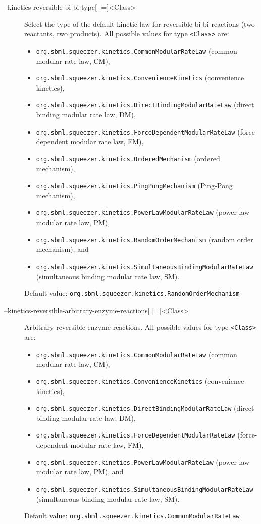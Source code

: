 \begin{description}
\item[--kinetics-reversible-bi-bi-type{[} |={]}<Class>]
  Select the type of the default kinetic law for reversible bi-bi
  reactions (two reactants, two products).
  All possible values for type \texttt{<Class>} are:
  \begin{itemize}
  \item\texttt{org.sbml.squeezer.kinetics.CommonModularRateLaw} (common modular rate law, CM),
  \item\texttt{org.sbml.squeezer.kinetics.ConvenienceKinetics} (convenience kinetics),
  \item\texttt{org.sbml.squeezer.kinetics.DirectBindingModularRateLaw} (direct binding modular rate law, DM),
  \item\texttt{org.sbml.squeezer.kinetics.ForceDependentModularRateLaw} (force-dependent modular rate law, FM),
  \item\texttt{org.sbml.squeezer.kinetics.OrderedMechanism} (ordered mechanism),
  \item\texttt{org.sbml.squeezer.kinetics.PingPongMechanism} (Ping-Pong mechanism),
  \item\texttt{org.sbml.squeezer.kinetics.PowerLawModularRateLaw} (power-law modular rate law, PM),
  \item\texttt{org.sbml.squeezer.kinetics.RandomOrderMechanism} (random order mechanism), and
  \item\texttt{org.sbml.squeezer.kinetics.SimultaneousBindingModularRateLaw} (simultaneous binding modular rate law, SM).
  \end{itemize}
  Default value: \texttt{org.sbml.squeezer.kinetics.RandomOrderMechanism}

\item[--kinetics-reversible-arbitrary-enzyme-reactions{[} |={]}<Class>]
  Arbitrary reversible enzyme reactions.
  All possible values for type \texttt{<Class>} are:
  \begin{itemize}
  \item\texttt{org.sbml.squeezer.kinetics.CommonModularRateLaw} (common modular rate law, CM),
  \item\texttt{org.sbml.squeezer.kinetics.ConvenienceKinetics} (convenience kinetics),
  \item\texttt{org.sbml.squeezer.kinetics.DirectBindingModularRateLaw} (direct binding modular rate law, DM),
  \item\texttt{org.sbml.squeezer.kinetics.ForceDependentModularRateLaw} (force-dependent modular rate law, FM),
  \item\texttt{org.sbml.squeezer.kinetics.PowerLawModularRateLaw} (power-law modular rate law, PM), and
  \item\texttt{org.sbml.squeezer.kinetics.SimultaneousBindingModularRateLaw} (simultaneous binding modular rate law, SM).
  \end{itemize}
  Default value: \texttt{org.sbml.squeezer.kinetics.CommonModularRateLaw}
\end{description}


